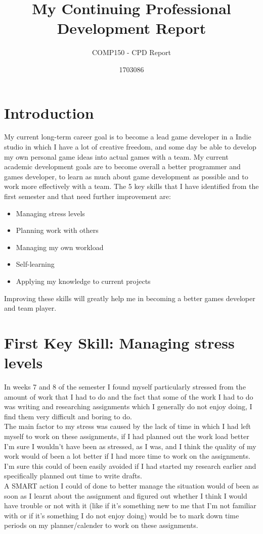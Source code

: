 \documentclass{scrartcl}
\title{My Continuing Professional Development Report}
\subtitle{COMP150 - CPD Report}
\author{1703086}
\begin{document}
\maketitle

\section{Introduction}

My current long-term career goal is to become a lead game developer in a Indie studio in which I have a lot of creative freedom, and some day be able to develop my own personal game ideas into actual games with a team. My current academic development goals are to become overall a better programmer and games developer, to learn as much about game development as possible and to work more effectively with a team. The 5 key skills that I have identified from the first semester and that need further improvement are:
\begin{small}
\begin{itemize}
  \item Managing stress levels
  \item Planning work with others
  \item Managing my own workload
  \item Self-learning
  \item Applying my knowledge to current projects
\end{itemize}
\end{small}
Improving these skills will greatly help me in becoming a better games developer and team player.

\section{First Key Skill: Managing stress levels}

In weeks 7 and 8 of the semester I found myself particularly stressed from the amount of work that I had to do and the fact that some of the work I had to do was writing and researching assignments which I generally do not enjoy doing, I find them very difficult and boring to do.
\\ 
The main factor to my stress was caused by the lack of time in which I had left myself to work on these assignments, if I had planned out the work load better I'm sure I wouldn't have been as stressed, as I was, and I think the quality of my work would of been a lot better if I had more time to work on the assignments. I'm sure this could of been easily avoided if I had started my research earlier and specifically planned out time to write drafts. 
\\
A SMART action I could of done to better manage the situation would of been as soon as I learnt about the assignment and figured out whether I think I would have trouble or not with it (like if it's something new to me that I'm not familiar with or if it's something I do not enjoy doing) would be to mark down time periods on my planner/calender to work on these assignments. 
\end{document}
